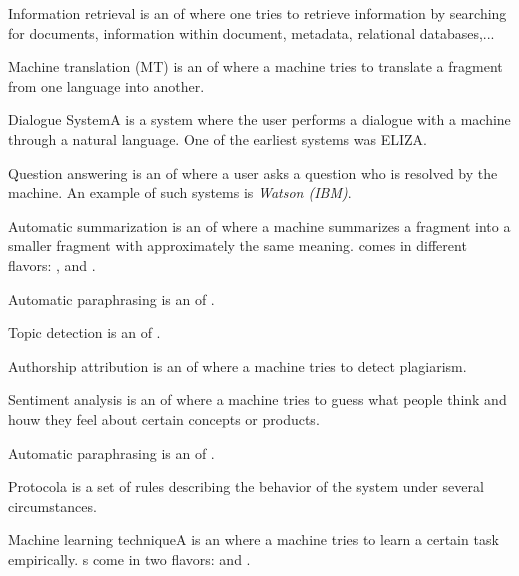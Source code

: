 \begin{df}{Information retrieval}\sb{} is an \app{} of \nlp{} where one tries to retrieve information by searching for documents, information within document, metadata, relational databases,...
\end{df}
\begin{df}{Machine translation (MT)}\sb{} is an \app{} of \nlp{} where a machine tries to translate a fragment from one language into another.
\end{df}
\begin{df}{Dialogue System}A \sb{} is a system where the user performs a dialogue with a machine through a natural language. One of the earliest systems was ELIZA.
\end{df}
\begin{df}{Question answering}\sb{} is an \app{} of \nlp{} where a user asks a question who is resolved by the machine. An example of such systems is \emph{Watson (IBM)}.
\end{df}
\begin{df}{Automatic summarization}\sb{} is an \app{} of \nlp{} where a machine summarizes a fragment into a smaller fragment with approximately the same meaning. \sb{} comes in different flavors: ,  and .
\end{df}
\begin{df}{Automatic paraphrasing}\sb{} is an \app{} of \nlp{}.
\end{df}
\begin{df}{Topic detection}\sb{} is an \app{} of \nlp{}.
\end{df}
\begin{df}{Authorship attribution}\sb{} is an \app{} of \nlp{} where a machine tries to detect plagiarism.
\end{df}
\begin{df}{Sentiment analysis}\sb{} is an \app{} of \nlp{} where a machine tries to guess what people think and houw they feel about certain concepts or products.
\end{df}
\begin{df}{Automatic paraphrasing}\sb{} is an \app{} of \nlp{}.
\end{df}
\begin{df}{Protocol}a \sb{} is a set of rules describing the behavior of the system under several circumstances.
\end{df}
\begin{df}{Machine learning technique}A \sb{} is an \tcq{} where a machine tries to learn a certain task empirically. \sb{}s come in two flavors:  and .
\end{df}
